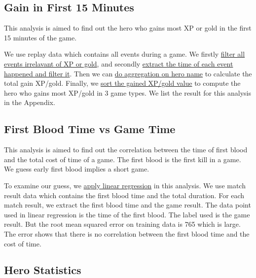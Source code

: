 \documentclass{article}
\begin{document}
\subsection{Gain in First 15 Minutes}

This analysis is aimed to find out the hero who gains most XP or gold in the first 15 minutes of the game.

We use replay data which contains all events during a game. We firstly \href{https://github.com/Vopaaz/big-data-psg-lgd/blob/master/src/main/scala/First15minGain.scala#L44-L47}{filter all events irrelavant of XP or gold}, and secondly \href{https://github.com/Vopaaz/big-data-psg-lgd/blob/master/src/main/scala/First15minGain.scala#L48-L50}{extract the time of each event happened and filter it}.
Then we can \href{https://github.com/Vopaaz/big-data-psg-lgd/blob/master/src/main/scala/First15minGain.scala#L81-L82}{do aggregation on hero name} to calculate the total gain XP/gold. Finally, we \href{https://github.com/Vopaaz/big-data-psg-lgd/blob/master/src/main/scala/First15minGain.scala#L89-L96}{sort the gained XP/gold value} to compute the hero who gains most XP/gold in 3 game types. We list the result for this analysis in the Appendix.

\subsection{First Blood Time vs Game Time}

This analysis is aimed to find out the correlation between the time of first blood and the total cost of time of a game. The first blood is the first kill in a game. We guess early first blood implies a short game.

To examine our guess, we \href{https://github.com/Vopaaz/big-data-psg-lgd/blob/master/src/main/scala/FirstBloodTrain.scala#L31-L33}{apply linear regression} in this analysis. We use match result data which contains the first blood time and the total duration. For each match result, we extract the first blood time and the game result. The data point used in linear regression is the time of the first blood. The label used is the game result. But the root mean squared error on training data is 765 which is large. The error shows that there is no correlation between the first blood time and the cost of time.

\subsection{Hero Statistics}
\end{document}
